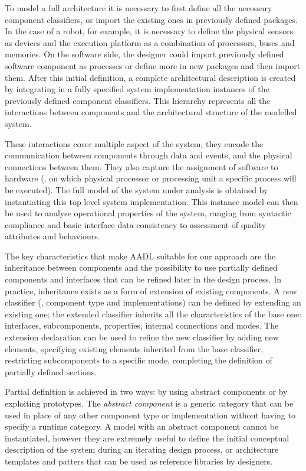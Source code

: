 To model a full architecture it is necessary to first define all the necessary component classifiers, or import the existing ones in previously defined packages. In the case of a robot, for example, it is necessary to define the physical sensors as devices and the execution platform as a combination of processors, buses and memories. On the software side, the designer could import previously defined software component as processes or define more in new packages and then import them. After this initial definition, a complete architectural description is created by integrating in a fully specified system implementation instances of the previously defined component classifiers. This hierarchy represents all the interactions between components and the architectural structure of the modelled system.

These interactions cover multiple aspect of the system, they encode the communication between components through data and events, and the physical connections between them. They also capture the assignment of software to hardware (\eg, on which physical processor or processing unit a specific process will be executed). The full model of the system under analysis is obtained by instantiating this top level system implementation. This instance model can then be used to analyse operational properties of the system, ranging from syntactic compliance and basic interface data consistency to assessment of quality attributes and behaviours.

The key characteristics that make AADL suitable for our approach are the inheritance between components and the possibility to use partially defined components and interfaces that can be refined later in the design process. In practice, inheritance exists as a form of extension of existing components. A new classifier (\ie, component type and implementations) can be defined by extending an existing one; the extended classifier inherits all the characteristics of the base one: interfaces, subcomponents, properties, internal connections and modes. The extension declaration can be used to refine the new classifier by adding new elements, specifying existing elements inherited from the base classifier, restricting subcomponents to a specific mode, completing the definition of partially defined sections. 

Partial definition is achieved in two ways: by using abstract components or by exploiting prototypes. The \textit{abstract component} is a generic category that can be used in place of any other component type or implementation without having to specify a runtime category. A model with an abstract component cannot be instantiated, however they are extremely useful to define the initial conceptual description of the system during an iterating design process, or architecture templates and patters that can be used as reference libraries by designers.

